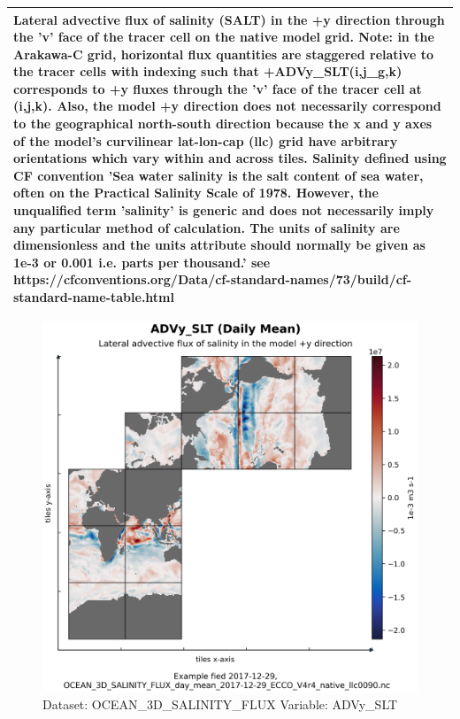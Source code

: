 \begin{longtable}{|m{}|m{}|m{}|m{}|}
\multicolumn{4}{|p{1\textwidth}|}{Lateral advective flux of salinity (SALT) in the +y direction through the 'v' face of the tracer cell on the native model grid. Note: in the Arakawa-C grid, horizontal flux quantities are staggered relative to the tracer cells with indexing such that +ADVy\_SLT(i,j\_g,k) corresponds to +y fluxes through the 'v' face of the tracer cell at (i,j,k). Also, the model +y direction does not necessarily correspond to the geographical north-south direction because the x and y axes of the model's curvilinear lat-lon-cap (llc) grid have arbitrary orientations which vary within and across tiles. Salinity defined using CF convention 'Sea water salinity is the salt content of sea water, often on the Practical Salinity Scale of 1978. However, the unqualified term 'salinity' is generic and does not necessarily imply any particular method of calculation. The units of salinity are dimensionless and the units attribute should normally be given as 1e-3 or 0.001 i.e. parts per thousand.' see https://cfconventions.org/Data/cf-standard-names/73/build/cf-standard-name-table.html} \\ \hline
\end{longtable}

\begin{figure}[H]
\centering
\includegraphics[scale=0.55]{../images/plots/native_plots/Ocean_Three-Dimensional_Salinity_Fluxes/ADVy_SLT.png}
\caption{Dataset: OCEAN\_3D\_SALINITY\_FLUX Variable: ADVy\_SLT}
\label{tab:table-OCEAN_3D_SALINITY_FLUX_ADVy_SLT-Plot}
\end{figure}
\pagebreak
